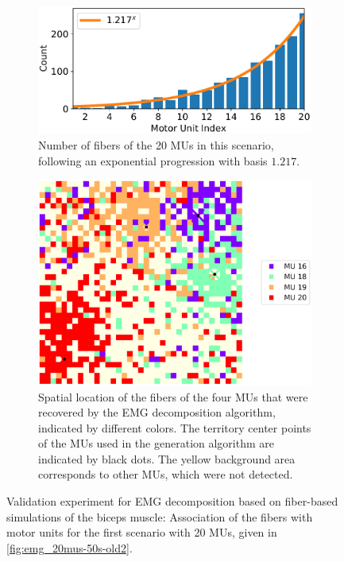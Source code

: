 \begin{figure}
  \centering%
  \begin{subfigure}[t]{0.45\textwidth}%
    \centering%
    \includegraphics[width=\textwidth]{images/results/application/oldmus2.pdf}%
    \caption{Number of fibers of the 20 MUs in this scenario, following an exponential progression with basis $1.217$.}%
    \label{fig:oldmus_progression}%
  \end{subfigure}\hfill
  \begin{subfigure}[t]{0.45\textwidth}%
    \centering%
    \includegraphics[width=\textwidth]{images/results/application/oldmus1.pdf}%
    \caption{Spatial location of the fibers of the four MUs that were recovered by the EMG decomposition algorithm, indicated by different colors. The territory center points of the MUs used in the generation algorithm are indicated by black dots. The yellow background area corresponds to other MUs, which were not detected.}%
    \label{fig:oldmus_2d}%
  \end{subfigure}
  \caption{Validation experiment for EMG decomposition based on fiber-based simulations of the biceps  muscle: Association of the fibers with motor units for the first scenario with 20 MUs, given in \cref{fig:emg_20mus-50s-old2}.}%
  \label{fig:oldmus}%
\end{figure}

